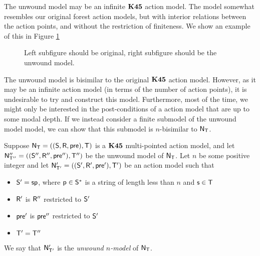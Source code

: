 The unwound model may be an infinite $\bf K45$ action model.
The model somewhat resembles our original forest action models,
but with interior relations between the action points, and without the
restriction of finiteness.
We show an example of this in Figure \ref{generatedTreeExample}

\begin{figure}
\centering
\caption[Example of unwound tree]{\FIXME Left subfigure should be original, right subfigure should be the
unwound model.} \label{generatedTreeExample}
\end{figure}

The unwound model is bisimilar to the original $\bf K45$ action model.
However, as it may be an infinite action model (in terms of the number of action
points), it is undesirable to try and construct this model.
Furthermore, most of the time, we might only be interested in the
post-conditions of a action model that are up to some modal depth.
If we instead consider a finite submodel of the unwound model
model, we can show that this submodel is $n$-bisimilar to $\mathrm{\mathsf{N}}_\mathrm{\mathsf{T}}$.

\begin{defn} \label{unwoundNModel}
  Suppose $\mathrm{\mathsf{N}}_\mathrm{\mathsf{T}} = ((\mathrm{\mathsf{S}},\mathrm{\mathsf{R}},\mathrm{\mathsf{pre}}),\mathrm{\mathsf{T}})$ is a $\bf K45$ multi-pointed action model, and
	let $\mathrm{\mathsf{N}}''_{\mathrm{\mathsf{T}}''} = ((\mathrm{\mathsf{S}}'',\mathrm{\mathsf{R}}'',\mathrm{\mathsf{pre}}''),\mathrm{\mathsf{T}}'')$ be the unwound model of $\mathrm{\mathsf{N}}_\mathrm{\mathsf{T}}$.
  Let $n$ be some positive integer and let $\mathrm{\mathsf{N}}'_{\mathrm{\mathsf{T}}'} = ((\mathrm{\mathsf{S}}',\mathrm{\mathsf{R}}',\mathrm{\mathsf{pre}}'),\mathrm{\mathsf{T}}')$ be an action model such that
  \begin{itemize}
		\item $\mathrm{\mathsf{S}}' = \mathrm{\mathsf{s}} \mathrm{\mathsf{p}}$, where $\mathrm{\mathsf{p}} \in \mathrm{\mathsf{S}}^\ast$ is a string of length
    less than $n$ and $\mathrm{\mathsf{s}} \in \mathrm{\mathsf{T}}$
		\item $\mathrm{\mathsf{R}}'$ is $\mathrm{\mathsf{R}}''$ restricted to $\mathrm{\mathsf{S}}'$
		\item $\mathrm{\mathsf{pre}}'$ is $\mathrm{\mathsf{pre}}''$ restricted to $\mathrm{\mathsf{S}}'$
		\item $\mathrm{\mathsf{T}}' = \mathrm{\mathsf{T}}''$
  \end{itemize}
  We say that $\mathrm{\mathsf{N}}'_{\mathrm{\mathsf{T}}'}$ is the {\em unwound $n$-model} of $\mathrm{\mathsf{N}}_\mathrm{\mathsf{T}}$.
\end{defn}

